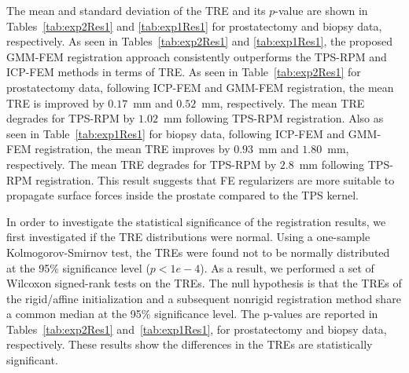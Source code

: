 \documentclass[journal]{IEEEtran}
\begin{document}
The mean and standard deviation of the TRE and its $p$-value are shown in Tables~\ref{tab:exp2Res1} and \ref{tab:exp1Res1} for prostatectomy and biopsy data, respectively. As seen in Tables~\ref{tab:exp2Res1} and \ref{tab:exp1Res1}, the proposed GMM-FEM registration approach consistently outperforms the TPS-RPM and ICP-FEM methods in terms of TRE. As seen in Table~\ref{tab:exp2Res1} for prostatectomy data, following ICP-FEM and GMM-FEM registration, the mean TRE is improved by $0.17$~mm and $0.52$~mm, respectively. The mean TRE degrades for TPS-RPM by $1.02$~mm following TPS-RPM registration. Also as seen in Table~\ref{tab:exp1Res1} for biopsy data, following ICP-FEM and GMM-FEM registration, the mean TRE improves by $0.93$~mm and $1.80$~mm, respectively. The mean TRE degrades for TPS-RPM by $2.8$~mm following TPS-RPM registration. This result suggests that FE regularizers are more suitable to propagate surface forces inside the prostate compared to the TPS kernel.

In order to investigate the statistical significance of the registration results, we first investigated if the TRE distributions were normal. Using a one-sample Kolmogorov-Smirnov test, the TREs were found not to be normally distributed at the 95\% significance level ($p<1e-4$). As a result, we performed a set of Wilcoxon signed-rank tests on the TREs. The null hypothesis is that the TREs of the rigid/affine initialization and a subsequent nonrigid registration method share a common median at the 95\% significance level. The p-values are reported in Tables~\ref{tab:exp2Res1} and~\ref{tab:exp1Res1}, for prostatectomy and biopsy data, respectively. These results show the differences in the TREs are statistically significant.
\end{document}
